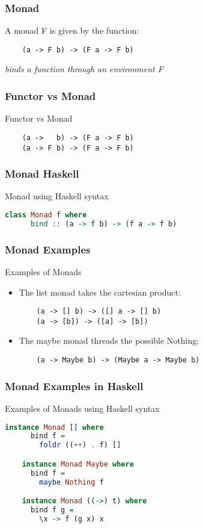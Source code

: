 \begin{frame}[fragile]
\frametitle{Monad}
\begin{block}{A monad F is given by the function:}
\begin{lstlisting}
    (a -> F b) -> (F a -> F b)
\end{lstlisting}
\end{block}
\emph{binds a function through an environment F}
\end{frame}

\begin{frame}[fragile]
\frametitle{Functor vs Monad}
\begin{block}{Functor vs Monad}
\begin{lstlisting}
    (a ->   b) -> (F a -> F b)
    (a -> F b) -> (F a -> F b)
\end{lstlisting}
\end{block}
\end{frame}

\begin{frame}[fragile]
\frametitle{Monad Haskell}
\begin{block}{Monad using Haskell syntax}
\begin{lstlisting}[language=haskell]
    class Monad f where
      bind :: (a -> f b) -> (f a -> f b)
\end{lstlisting}
\end{block}
\end{frame}

\begin{frame}[fragile]
\frametitle{Monad Examples}
\begin{block}{Examples of Monads}
\begin{itemize}
  \item The list monad takes the cartesian product:
    \begin{lstlisting}
    (a -> [] b) -> ([] a -> [] b)
    (a -> [b]) -> ([a] -> [b])
    \end{lstlisting}
  \item The maybe monad threads the possible Nothing:
    \begin{lstlisting}
    (a -> Maybe b) -> (Maybe a -> Maybe b)
    \end{lstlisting}    
\end{itemize}
\end{block}
\end{frame}

\begin{frame}[fragile]
\frametitle{Monad Examples in Haskell}
\begin{block}{Examples of Monads using Haskell syntax}
\begin{lstlisting}[language=haskell]
    instance Monad [] where
      bind f =
        foldr ((++) . f) []

    instance Monad Maybe where
      bind f =
        maybe Nothing f

    instance Monad ((->) t) where
      bind f g =
        \x -> f (g x) x
\end{lstlisting}
\end{block}
\end{frame}
